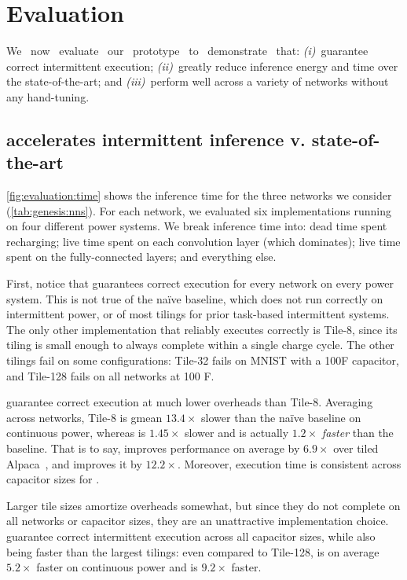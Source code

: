 \section{Evaluation}
\label{sonic:evaluation}

We ~now ~evaluate ~our ~prototype ~to ~demonstrate ~that:
%
\emph{(i)}~\sonictails guarantee correct intermittent execution;
%
\emph{(ii)}~\sonictails greatly reduce inference energy and time over
the state-of-the-art; and
%
\emph{(iii)}~\sonictails perform well across a variety of networks
without any hand-tuning.

\subsection{\sonictails accelerates intermittent inference 
v. state-of-the-art}

\autoref{fig:evaluation:time} shows the inference time for the three
networks we consider (\autoref{tab:genesis:nns}).
%
For each network, we evaluated six implementations running on four different power systems.
%
We break inference time into:
dead time spent recharging;
live time spent on each convolution layer (which dominates);
live time spent on the fully-connected layers;
and everything else.

First, notice that \sonictails guarantees correct execution for every
network on every power system.
%
This is not true of the na\"ive baseline, which does not run correctly
on intermittent power, or of most tilings for prior task-based
intermittent systems.
%
The only other implementation that reliably executes correctly is
Tile-8, since its tiling is small enough to always complete within a
single charge cycle.
%
The other tilings fail on some configurations: Tile-32 fails on
MNIST with a 100\textmu F capacitor, and Tile-128 fails on all networks at 100\textmu
F.

\sonictails guarantee correct execution at much lower
overheads than Tile-8.
%
Averaging across networks, Tile-8 is gmean $13.4\times$ slower than the
na\"ive baseline on continuous power, whereas \sonic is $1.45\times$ slower and 
\tails is actually $1.2\times$ \emph{faster} than the baseline.
%
That is to say, \sonic improves performance on average by $6.9\times$ over tiled Alpaca~\cite{alpaca},
and \tails improves it by $12.2\times$.
%
Moreover, execution time is consistent across capacitor sizes for \sonictails.

\figEvalOther

Larger tile sizes amortize overheads somewhat, but since they do not
complete on all networks or capacitor sizes, they are an unattractive
implementation choice.
%
\sonictails guarantee correct intermittent execution across all capacitor
sizes, while also being faster than the largest tilings: even compared
to Tile-128, \sonic is on average $5.2\times$ faster on continuous power and \tails
is $9.2\times$ faster.

